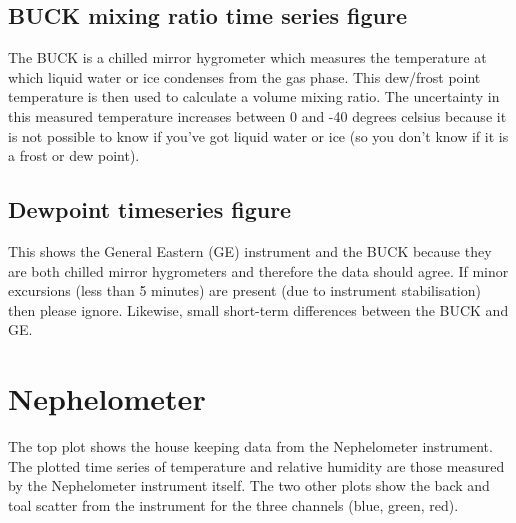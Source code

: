 \subsection*{BUCK mixing ratio time series figure}
The BUCK is a chilled mirror hygrometer which measures the temperature at which liquid water or ice condenses from the gas phase. This dew/frost point temperature is then used to calculate a volume mixing ratio. 
The uncertainty in this measured temperature increases between 0 and -40 degrees celsius because it is not possible to know if you've got liquid water or ice (so you don't know if it is a frost or dew point). 

\subsection*{Dewpoint timeseries figure}
This shows the General Eastern (GE) instrument and the BUCK because they are both chilled mirror hygrometers and therefore the data should agree. If minor excursions (less than 5 minutes) are present (due to instrument stabilisation) 
then please ignore. Likewise, small short-term differences between the BUCK and GE.

\section*{Nephelometer}
The top plot shows the house keeping data from the Nephelometer instrument. The plotted time series of temperature and relative humidity are those measured by the Nephelometer instrument itself. The two other plots show the back and toal scatter from the instrument for the three channels (blue, green, red).

